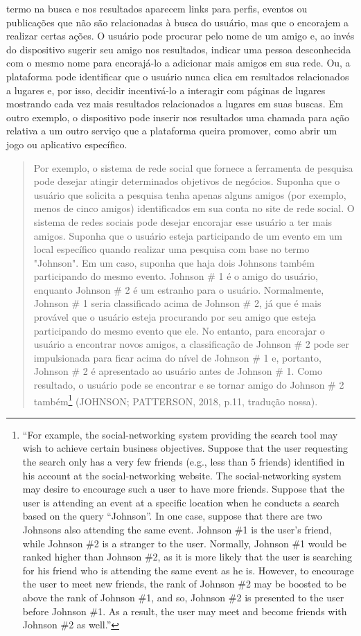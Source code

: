 termo na busca e nos resultados aparecem links para perfis, eventos ou
publicações que não são relacionadas à busca do usuário, mas que o
encorajem a realizar certas ações. O usuário pode procurar pelo nome de
um amigo e, ao invés do dispositivo sugerir seu amigo nos resultados,
indicar uma pessoa desconhecida com o mesmo nome para encorajá-lo a
adicionar mais amigos em sua rede. Ou, a plataforma pode identificar que
o usuário nunca clica em resultados relacionados a lugares e, por isso,
decidir incentivá-lo a interagir com páginas de lugares mostrando cada
vez mais resultados relacionados a lugares em suas buscas. Em outro
exemplo, o dispositivo pode inserir nos resultados uma chamada para ação
relativa a um outro serviço que a plataforma queira promover, como abrir
um jogo ou aplicativo específico.

\begin{quote}
Por exemplo, o sistema de rede social que fornece a ferramenta de
pesquisa pode desejar atingir determinados objetivos de negócios.
Suponha que o usuário que solicita a pesquisa tenha apenas alguns amigos
(por exemplo, menos de cinco amigos) identificados em sua conta no site
de rede social. O sistema de redes sociais pode desejar encorajar esse
usuário a ter mais amigos. Suponha que o usuário esteja participando de
um evento em um local específico quando realizar uma pesquisa com base
no termo "Johnson". Em um caso, suponha que haja dois Johnsons também
participando do mesmo evento. Johnson \# 1 é o amigo do usuário,
enquanto Johnson \# 2 é um estranho para o usuário. Normalmente, Johnson
\# 1 seria classificado acima de Johnson \# 2, já que é mais provável
que o usuário esteja procurando por seu amigo que esteja participando do
mesmo evento que ele. No entanto, para encorajar o usuário a encontrar
novos amigos, a classificação de Johnson \# 2 pode ser impulsionada para
ficar acima do nível de Johnson \# 1 e, portanto, Johnson \# 2 é
apresentado ao usuário antes de Johnson \# 1. Como resultado, o usuário
pode se encontrar e se tornar amigo do Johnson \# 2 também\footnote{``For
  example, the social-networking system providing the search tool may
  wish to achieve certain business objectives. Suppose that the user
  requesting the search only has a very few friends (e.g., less than 5
  friends) identified in his account at the social-networking website.
  The social-networking system may desire to encourage such a user to
  have more friends. Suppose that the user is attending an event at a
  specific location when he conducts a search based on the query
  ``Johnson''. In one case, suppose that there are two Johnsons also
  attending the same event. Johnson \#1 is the user's friend, while
  Johnson \#2 is a stranger to the user. Normally, Johnson \#1 would be
  ranked higher than Johnson \#2, as it is more likely that the user is
  searching for his friend who is attending the same event as he is.
  However, to encourage the user to meet new friends, the rank of
  Johnson \#2 may be boosted to be above the rank of Johnson \#1, and
  so, Johnson \#2 is presented to the user before Johnson \#1. As a
  result, the user may meet and become friends with Johnson \#2 as
  well.''} (JOHNSON; PATTERSON, 2018, p.11, tradução nossa).
\end{quote}

